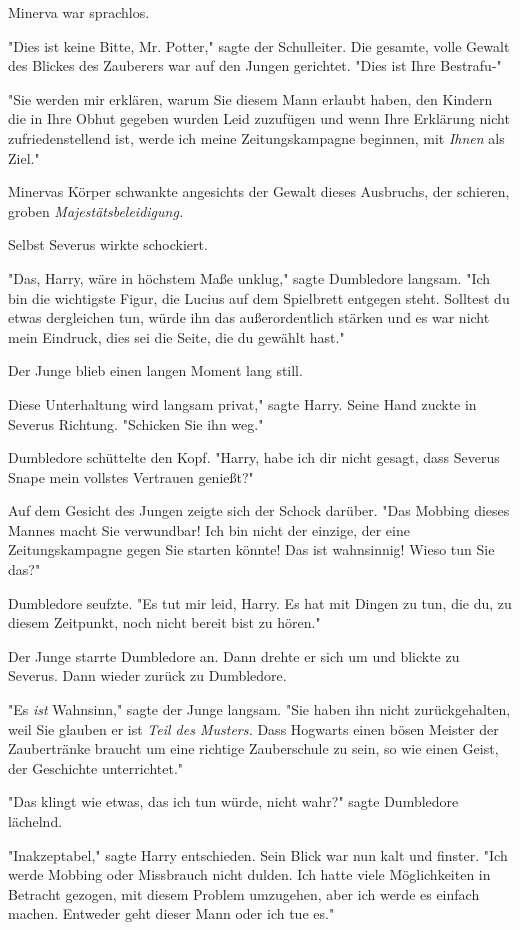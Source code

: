 {Minerva war sprachlos.

"Dies ist keine Bitte, Mr. Potter," sagte der Schulleiter. Die gesamte, volle Gewalt des Blickes des Zauberers war auf den Jungen gerichtet. "Dies ist Ihre Bestrafu-"

"Sie werden mir erklären, warum Sie diesem Mann erlaubt haben, den Kindern die in Ihre Obhut gegeben wurden Leid zuzufügen und wenn Ihre Erklärung nicht zufriedenstellend ist, werde ich meine Zeitungskampagne beginnen, mit \emph{Ihnen} als Ziel."

Minervas Körper schwankte angesichts der Gewalt dieses Ausbruchs, der schieren, groben \emph{Majestätsbeleidigung.}

Selbst Severus wirkte schockiert.

"Das, Harry, wäre in höchstem Maße unklug," sagte Dumbledore langsam. "Ich bin die wichtigste Figur, die Lucius auf dem Spielbrett entgegen steht. Solltest du etwas dergleichen tun, würde ihn das außerordentlich stärken und es war nicht mein Eindruck, dies sei die Seite, die du gewählt hast."

Der Junge blieb einen langen Moment lang still.

Diese Unterhaltung wird langsam privat," sagte Harry. Seine Hand zuckte in Severus Richtung. "Schicken Sie ihn weg."

Dumbledore schüttelte den Kopf. "Harry, habe ich dir nicht gesagt, dass Severus Snape mein vollstes Vertrauen genießt?"

Auf dem Gesicht des Jungen zeigte sich der Schock darüber. "Das Mobbing dieses Mannes macht Sie verwundbar! Ich bin nicht der einzige, der eine Zeitungskampagne gegen Sie starten könnte! Das ist wahnsinnig! Wieso tun Sie das?"

Dumbledore seufzte. "Es tut mir leid, Harry. Es hat mit Dingen zu tun, die du, zu diesem Zeitpunkt, noch nicht bereit bist zu hören."

Der Junge starrte Dumbledore an. Dann drehte er sich um und blickte zu Severus. Dann wieder zurück zu Dumbledore.

"Es \emph{ist} Wahnsinn," sagte der Junge langsam. "Sie haben ihn nicht zurückgehalten, weil Sie glauben er ist \emph{Teil des Musters.} Dass Hogwarts einen bösen Meister der Zaubertränke braucht um eine richtige Zauberschule zu sein, so wie einen Geist, der Geschichte unterrichtet."

"Das klingt wie etwas, das ich tun würde, nicht wahr?" sagte Dumbledore lächelnd.

"Inakzeptabel," sagte Harry entschieden. Sein Blick war nun kalt und finster. "Ich werde Mobbing oder Missbrauch nicht dulden. Ich hatte viele Möglichkeiten in Betracht gezogen, mit diesem Problem umzugehen, aber ich werde es einfach machen. Entweder geht dieser Mann oder ich tue es."

}
